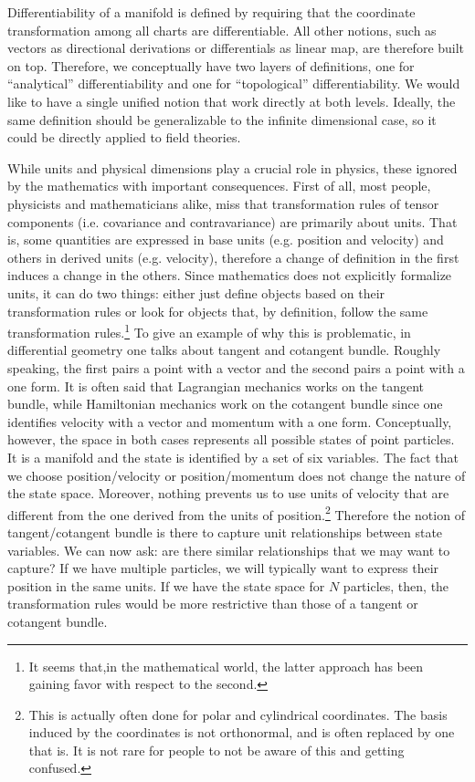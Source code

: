 \documentclass[10pt,twocolumn, nofootinbib]{revtex4-2}
\begin{document}
Differentiability of a manifold is defined by requiring that the coordinate transformation among all charts are differentiable. All other notions, such as vectors as directional derivations or differentials as linear map, are therefore built on top. Therefore, we conceptually have two layers of definitions, one for ``analytical'' differentiability and one for ``topological'' differentiability. We would like to have a single unified notion that work directly at both levels. Ideally, the same definition should be generalizable to the infinite dimensional case, so it could be directly applied to field theories.

While units and physical dimensions play a crucial role in physics, these ignored by the mathematics with important consequences. First of all, most people, physicists and mathematicians alike, miss that transformation rules of tensor components (i.e. covariance and contravariance) are primarily about units. That is, some quantities are expressed in base units (e.g. position and velocity) and others in derived units (e.g. velocity), therefore a change of definition in the first induces a change in the others. Since mathematics does not explicitly formalize units, it can do two things: either just define objects based on their transformation rules or look for objects that, by definition, follow the same transformation rules.\footnote{It seems that,in the mathematical world, the latter approach has been gaining favor with respect to the second.} To give an example of why this is problematic, in differential geometry one talks about tangent and cotangent bundle. Roughly speaking, the first pairs a point with a vector and the second pairs a point with a one form. It is often said that Lagrangian mechanics works on the tangent bundle, while Hamiltonian mechanics work on the cotangent bundle since one identifies velocity with a vector and momentum with a one form. Conceptually, however, the space in both cases represents all possible states of point particles. It is a manifold and the state is identified by a set of six variables. The fact that we choose position/velocity or position/momentum does not change the nature of the state space. Moreover, nothing prevents us to use units of velocity that are different from the one derived from the units of position.\footnote{This is actually often done for polar and cylindrical coordinates. The basis induced by the coordinates is not orthonormal, and is often replaced by one that is. It is not rare for people to not be aware of this and getting confused.} Therefore the notion of tangent/cotangent bundle is there to capture unit relationships between state variables. We can now ask: are there similar relationships that we may want to capture? If we have multiple particles, we will typically want to express their position in the same units. If we have the state space for $N$ particles, then, the transformation rules would be more restrictive than those of a tangent or cotangent bundle.
\end{document}
